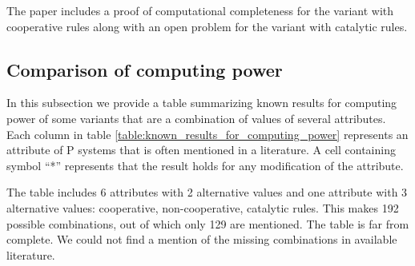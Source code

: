 The paper \cite{Paun12BridgingReactionSystems} includes a proof of computational completeness for the variant with cooperative rules along with an open problem for the variant with catalytic rules.



\subsection{Comparison of computing power} %
\label{sub:comparison_of_computing_power}

In this subsection we provide a table summarizing known results for computing power of some variants that are a combination of values of several attributes. Each column in table \ref{table:known_results_for_computing_power} represents an attribute of P systems that is often mentioned in a literature. A cell containing symbol ``*'' represents that the result holds for any modification of the attribute.

The table includes 6 attributes with 2 alternative values and one attribute with 3 alternative values: cooperative, non-cooperative, catalytic rules. This makes 192 possible combinations, out of which only 129 are mentioned. The table is far from complete. We could not find a mention of the missing combinations in available literature.

